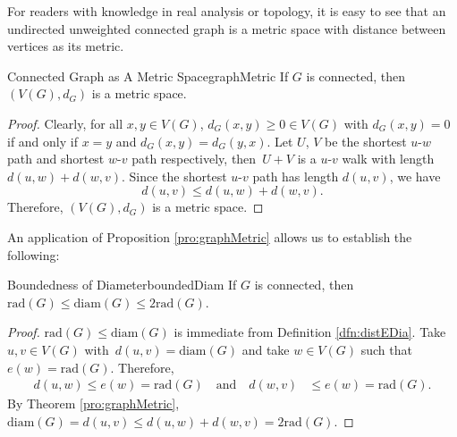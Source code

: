 \documentclass[math]{amznotes}
\theoremstyle{remark}
\newcommand{\0}{\mathbf{0}}
\newcommand{\1}{\mathbf{1}}
\begin{document}
For readers with knowledge in real analysis or topology, it is easy to see that an undirected unweighted connected graph is a metric space with distance between vertices as its metric. 
\begin{probox}{Connected Graph as A Metric Space}{graphMetric}
    If $G$ is connected, then $(V(G), d_G)$ is a metric space.
    \tcblower   
    \begin{proof}
        Clearly, for all $x, y \in V(G)$, $d_G(x, y) \geq 0 \in V(G)$ with $d_G(x, y) = 0$ if and only if $x = y$ and $d_G(x, y) = d_G(y, x)$. Let $U$, $V$ be the shortest $u$-$w$ path and shortest $w$-$v$ path respectively, then~$U + V$ is a $u$-$v$ walk with length $d(u, w) + d(w, v)$. Since the shortest $u$-$v$ path has length $d(u, v)$, we have
        \begin{equation*}
            d(u, v) \leq d(u, w) + d(w, v).
        \end{equation*}
        Therefore, $(V(G), d_G)$ is a metric space.
    \end{proof}
\end{probox}
An application of Proposition \ref{pro:graphMetric} allows us to establish the following:
\begin{probox}{Boundedness of Diameter}{boundedDiam}
    If $G$ is connected, then $\mathrm{rad}(G) \leq \mathrm{diam}(G) \leq 2\mathrm{rad}(G)$.
    \tcblower
    \begin{proof}
        $\mathrm{rad}(G) \leq \mathrm{diam}(G)$ is immediate from Definition \ref{dfn:distEDia}. Take $u, v \in V(G)$ with~$d(u, v) = \mathrm{diam}(G)$ and take $w \in V(G)$ such that $e(w) = \mathrm{rad}(G)$. Therefore,
        \begin{align*}
            d(u, w) \leq e(w) = \mathrm{rad}(G) \quad\textrm{and} \quad d(w, v) & \leq e(w) = \mathrm{rad}(G).
        \end{align*}
        By Theorem \ref{pro:graphMetric}, $\mathrm{diam}(G) = d(u, v) \leq d(u, w) + d(w, v) = 2\mathrm{rad}(G)$.
    \end{proof}
\end{probox}
\end{document}
